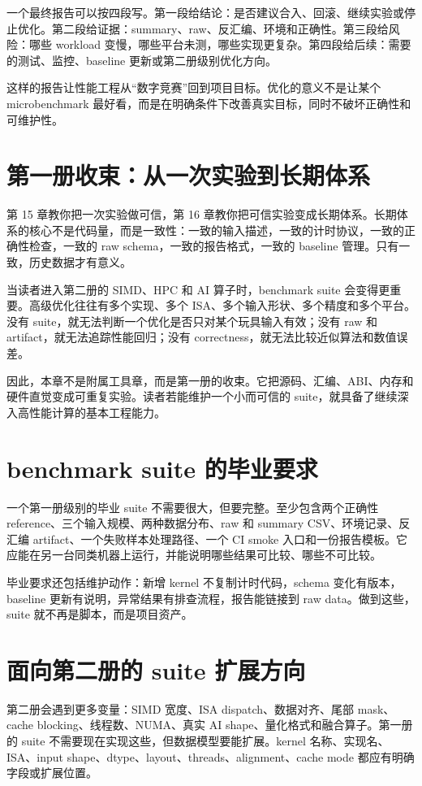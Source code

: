 一个最终报告可以按四段写。第一段给结论：是否建议合入、回滚、继续实验或停止优化。第二段给证据：summary、raw、反汇编、环境和正确性。第三段给风险：哪些 workload 变慢，哪些平台未测，哪些实现更复杂。第四段给后续：需要的测试、监控、baseline 更新或第二册级别优化方向。

这样的报告让性能工程从“数字竞赛”回到项目目标。优化的意义不是让某个 microbenchmark 最好看，而是在明确条件下改善真实目标，同时不破坏正确性和可维护性。

\section{第一册收束：从一次实验到长期体系}

第 15 章教你把一次实验做可信，第 16 章教你把可信实验变成长期体系。长期体系的核心不是代码量，而是一致性：一致的输入描述，一致的计时协议，一致的正确性检查，一致的 raw schema，一致的报告格式，一致的 baseline 管理。只有一致，历史数据才有意义。

当读者进入第二册的 SIMD、HPC 和 AI 算子时，benchmark suite 会变得更重要。高级优化往往有多个实现、多个 ISA、多个输入形状、多个精度和多个平台。没有 suite，就无法判断一个优化是否只对某个玩具输入有效；没有 raw 和 artifact，就无法追踪性能回归；没有 correctness，就无法比较近似算法和数值误差。

因此，本章不是附属工具章，而是第一册的收束。它把源码、汇编、ABI、内存和硬件直觉变成可重复实验。读者若能维护一个小而可信的 suite，就具备了继续深入高性能计算的基本工程能力。

\section{benchmark suite 的毕业要求}

一个第一册级别的毕业 suite 不需要很大，但要完整。至少包含两个正确性 reference、三个输入规模、两种数据分布、raw 和 summary CSV、环境记录、反汇编 artifact、一个失败样本处理路径、一个 CI smoke 入口和一份报告模板。它应能在另一台同类机器上运行，并能说明哪些结果可比较、哪些不可比较。

毕业要求还包括维护动作：新增 kernel 不复制计时代码，schema 变化有版本，baseline 更新有说明，异常结果有排查流程，报告能链接到 raw data。做到这些，suite 就不再是脚本，而是项目资产。

\section{面向第二册的 suite 扩展方向}

第二册会遇到更多变量：SIMD 宽度、ISA dispatch、数据对齐、尾部 mask、cache blocking、线程数、NUMA、真实 AI shape、量化格式和融合算子。第一册的 suite 不需要现在实现这些，但数据模型要能扩展。kernel 名称、实现名、ISA、input shape、dtype、layout、threads、alignment、cache mode 都应有明确字段或扩展位置。

